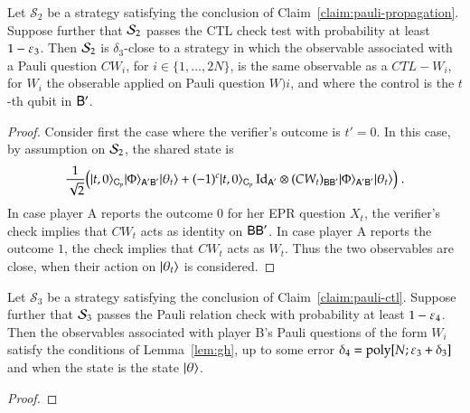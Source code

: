 \begin{claim}\label{claim:pauli-ctl}
Let $\mathcal{S}_2$ be a strategy satisfying the conclusion of Claim~\ref{claim:pauli-propagation}. Suppose further that $\mathcal{S}_2$ passes the CTL check test with probability at least $1-\varepsilon_3$. Then $\mathcal{S}_2$ is $\delta_3$-close to a strategy in which the observable associated with a Pauli question $CW_i$, for $i\in\{1,\ldots,2N\}$, is the same observable as a $CTL-W_i$, for $W_i$ the obserable applied on Pauli question $W)i$, and where the control is the $t$-th qubit in ${\mathsf{B}}'$. 
\end{claim}

\begin{proof}
Consider first the case where the verifier's outcome is $t'=0$. In this case, by assumption on $\mathcal{S}_2$, the shared state is 
$$ \frac{1}{\sqrt{2}}\big(|t,0\rangle_{{\textsf{C}}_p} |\Phi\rangle_{{\textsf{A}}'{\textsf{B}}'}  |\theta_t\rangle + (-1)^c  |t,0\rangle_{{\textsf{C}}_p} \mathop{\mathrm{Id}}\!\mathinner{}_{{\textsf{A}}'} \otimes (CW_t)_{{\textsf{B}}{\textsf{B}}'} |\Phi\rangle_{{\textsf{A}}'{\textsf{B}}'} |\theta_t\rangle\big)\;.$$
In case player A reports the outcome $0$ for her EPR question $X_t$, the verifier's check implies that $CW_t$ acts as identity on ${\textsf{B}}{\textsf{B}}'$. In case player A reports the outcome $1$, the check implies that $CW_t$ acts as $W_t$. Thus the two observables are close, when their action on $|\theta_t\rangle$ is considered. 
\end{proof}

\begin{claim}\label{claim:pauli-relation}
Let $\mathcal{S}_3$ be a strategy satisfying the conclusion of Claim~\ref{claim:pauli-ctl}. Suppose further that $\mathcal{S}_3$ passes the Pauli relation check with probability at least $1-\varepsilon_4$. Then the observables associated with player B's Pauli questions of the form $W_i$ satisfy the conditions of Lemma~\ref{lem:gh}, up to some error $\delta_4 = \operatorname{poly}[N;\varepsilon_3+\delta_3]$ and when the state is the state $|\theta\rangle$. 
\end{claim}

\begin{proof}
\end{proof}